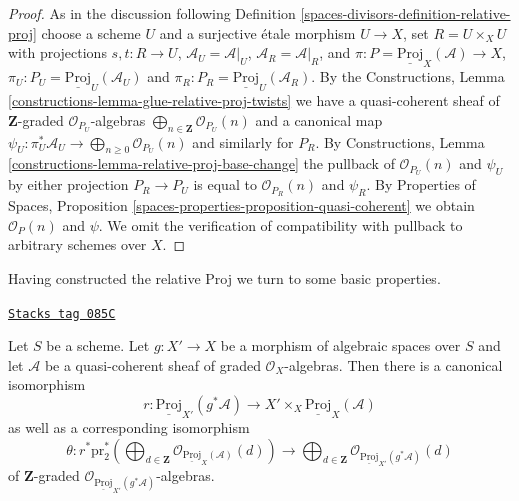 \begin{proof}
As in the discussion following Definition \ref{spaces-divisors-definition-relative-proj}
choose a scheme $U$ and a surjective \'etale morphism
$U \to X$, set $R = U \times_X U$ with projections $s, t : R \to U$,
$\mathcal{A}_U = \mathcal{A}|_U$, $\mathcal{A}_R = \mathcal{A}|_R$,
and $\pi : P = \underline{\text{Proj}}_X(\mathcal{A}) \to X$,
$\pi_U : P_U = \underline{\text{Proj}}_U(\mathcal{A}_U)$ and
$\pi_R : P_R = \underline{\text{Proj}}_U(\mathcal{A}_R)$.
By the
Constructions, Lemma \ref{constructions-lemma-glue-relative-proj-twists}
we have a quasi-coherent sheaf of $\mathbf{Z}$-graded
$\mathcal{O}_{P_U}$-algebras
$\bigoplus_{n \in \mathbf{Z}} \mathcal{O}_{P_U}(n)$
and a canonical map
$\psi_U : \pi_U^*\mathcal{A}_U \to \bigoplus_{n \geq 0} \mathcal{O}_{P_U}(n)$
and similarly for $P_R$. By
Constructions, Lemma \ref{constructions-lemma-relative-proj-base-change}
the pullback of $\mathcal{O}_{P_U}(n)$ and $\psi_U$ by either projection
$P_R \to P_U$ is equal to $\mathcal{O}_{P_R}(n)$ and $\psi_R$.
By Properties of Spaces, Proposition
\ref{spaces-properties-proposition-quasi-coherent}
we obtain $\mathcal{O}_{P}(n)$ and $\psi$.
We omit the verification of compatibility with pullback to
arbitrary schemes over $X$.
\end{proof}

Having constructed the relative Proj we turn to some basic
properties.

\begin{lemma}
\label{spaces-divisors-lemma-relative-proj-base-change}
\href{https://stacks.math.columbia.edu/tag/085C}{\texttt{Stacks tag 085C}}

Let $S$ be a scheme. Let $g : X' \to X$ be a morphism of algebraic spaces
over $S$ and let $\mathcal{A}$ be a quasi-coherent sheaf
of graded $\mathcal{O}_X$-algebras. Then there is a canonical isomorphism
$$
r :
\underline{\text{Proj}}_{X'}(g^*\mathcal{A})
\longrightarrow
X' \times_X \underline{\text{Proj}}_X(\mathcal{A})
$$
as well as a corresponding isomorphism
$$
\theta :
r^*\text{pr}_2^*\left(\bigoplus\nolimits_{d \in \mathbf{Z}}
\mathcal{O}_{\underline{\text{Proj}}_X(\mathcal{A})}(d)\right)
\longrightarrow
\bigoplus\nolimits_{d \in \mathbf{Z}}
\mathcal{O}_{\underline{\text{Proj}}_{X'}(g^*\mathcal{A})}(d)
$$
of $\mathbf{Z}$-graded
$\mathcal{O}_{\underline{\text{Proj}}_{X'}(g^*\mathcal{A})}$-algebras.
\end{lemma}

